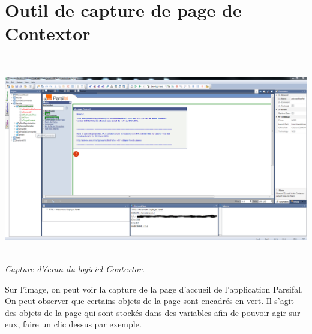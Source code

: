 \documentclass[a4paper,twoside,12pt,openright]{report}
\begin{document}
\chapter{Outil de capture de page de Contextor}
\begin{center}
\includegraphics[height=9cm]{contextorCapture.PNG}\\
\itshape Capture d'écran du logiciel Contextor.
\end{center}
Sur l'image, on peut voir la capture de la page d'accueil de l'application Parsifal. On peut observer que certains objets de la page sont encadrés en vert. Il s'agit des objets de la page qui sont stockés dans des variables afin de pouvoir agir sur eux, faire un clic dessus par exemple.
\end{document}
